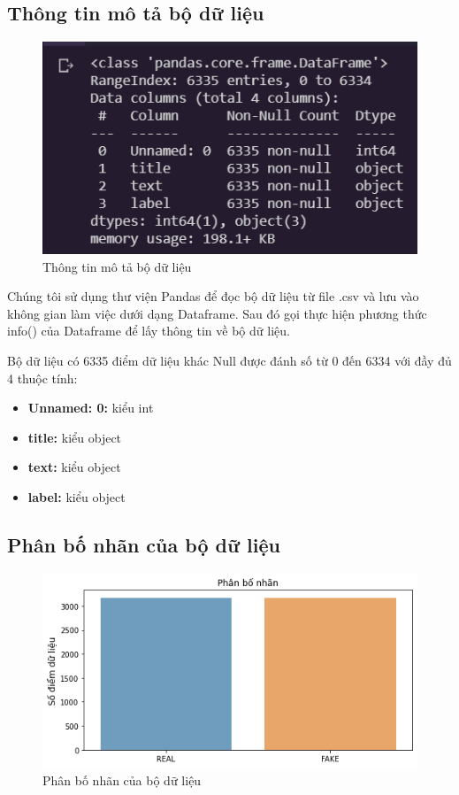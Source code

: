 \documentclass[12pt,a4paper,oneside]{book}
\begin{document}
	\subsection{Thông tin mô tả bộ dữ liệu}
				\begin{figure}[H]
					\begin{center}
						\includegraphics[width=0.78\columnwidth]{dfinfo}
					\end{center}
					\caption{Thông tin mô tả bộ dữ liệu}
				\end{figure}
				
	Chúng tôi sử dụng thư viện Pandas để đọc bộ dữ liệu từ file .csv và lưu  vào không gian làm việc dưới dạng Dataframe. Sau đó gọi thực hiện phương thức info() của Dataframe để lấy thông tin về bộ dữ liệu. 
	
	Bộ dữ liệu có 6335 điểm dữ liệu khác Null được đánh số từ 0 đến 6334 với đầy đủ 4 thuộc tính:
	\begin{itemize}
	\item \textbf{Unnamed: 0:} kiểu int
	\item \textbf{title:} kiểu object
	\item \textbf{text:} kiểu object
	\item \textbf{label:} kiểu object

	
	\end{itemize}
	\subsection{Phân bố nhãn của bộ dữ liệu}
			\begin{figure}[H]
				\begin{center}
					\includegraphics[width=0.8\columnwidth]{phanbonhan}
				\end{center}
				\caption{Phân bố nhãn của bộ dữ liệu}
			\end{figure}
			
\end{document}
